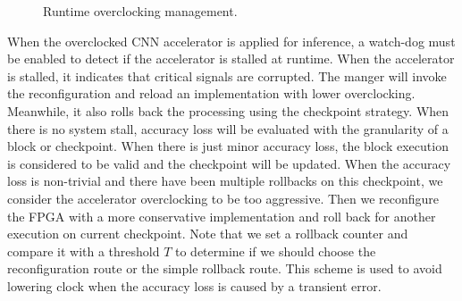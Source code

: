 \begin{figure}
    \caption{Runtime overclocking management.}
\label{fig:runtime-management}
\vspace{-1em}
\end{figure}

When the overclocked CNN accelerator is applied for inference, 
a watch-dog must be enabled to detect if the accelerator is stalled 
at runtime. When the accelerator is stalled, it indicates that critical 
signals are corrupted. The manger will invoke the reconfiguration 
and reload an implementation with lower overclocking. Meanwhile, 
it also rolls back the processing using the checkpoint strategy. 
When there is no system stall, accuracy loss will be evaluated 
with the granularity of a block or checkpoint. 
When there is just minor accuracy loss, the block execution is 
considered to be valid and the checkpoint will 
be updated. When the accuracy loss is non-trivial and there have been multiple rollbacks 
on this checkpoint, we consider the accelerator overclocking to be too aggressive.
Then we reconfigure the FPGA with a more conservative implementation 
and roll back for another execution on current checkpoint.
Note that we set a rollback counter and compare it with a threshold $T$ 
to determine if we should choose the reconfiguration route or the simple rollback route.
This scheme is used to avoid lowering clock when the accuracy loss is 
caused by a transient error.




